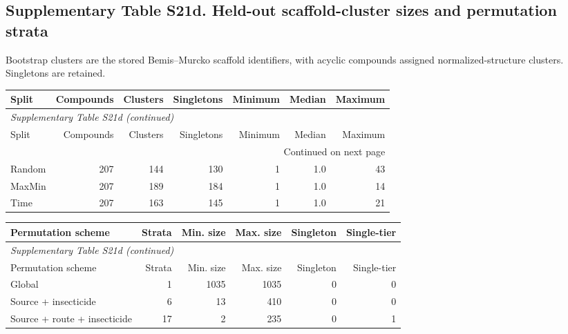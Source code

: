 \subsection*{Supplementary Table S21d. Held-out scaffold-cluster sizes and permutation strata}

Bootstrap clusters are the stored Bemis--Murcko scaffold identifiers, with acyclic compounds assigned normalized-structure clusters. Singletons are retained.

\begingroup\footnotesize\setlength{\tabcolsep}{4pt}

\begin{longtable}{lrrrrrr}

\toprule Split & Compounds & Clusters & Singletons & Minimum & Median & Maximum \\ \midrule\endfirsthead

\multicolumn{7}{l}{\textit{Supplementary Table S21d (continued)}} \\

\toprule Split & Compounds & Clusters & Singletons & Minimum & Median & Maximum \\ \midrule\endhead

\midrule\multicolumn{7}{r}{Continued on next page}\\\endfoot\bottomrule\endlastfoot

Random & 207 & 144 & 130 & 1 & 1.0 & 43 \\

MaxMin & 207 & 189 & 184 & 1 & 1.0 & 14 \\

Time & 207 & 163 & 145 & 1 & 1.0 & 21 \\

\end{longtable}\endgroup

\begin{longtable}{lrrrrr}

\toprule Permutation scheme & Strata & Min. size & Max. size & Singleton & Single-tier \\ \midrule\endfirsthead

\multicolumn{6}{l}{\textit{Supplementary Table S21d (continued)}} \\

\toprule Permutation scheme & Strata & Min. size & Max. size & Singleton & Single-tier \\ \midrule\endhead

\bottomrule\endlastfoot

Global & 1 & 1035 & 1035 & 0 & 0 \\

Source + insecticide & 6 & 13 & 410 & 0 & 0 \\

Source + route + insecticide & 17 & 2 & 235 & 0 & 1 \\

\end{longtable}

